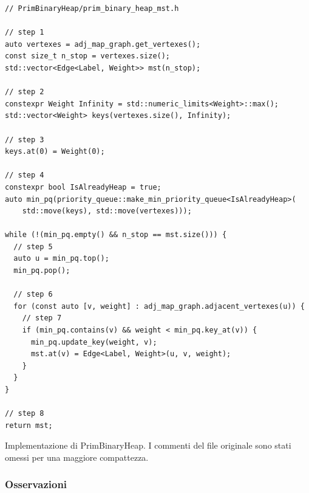 \begin{listing}[!ht]
\begin{verbatim}
// PrimBinaryHeap/prim_binary_heap_mst.h

// step 1
auto vertexes = adj_map_graph.get_vertexes();
const size_t n_stop = vertexes.size();
std::vector<Edge<Label, Weight>> mst(n_stop);

// step 2
constexpr Weight Infinity = std::numeric_limits<Weight>::max();
std::vector<Weight> keys(vertexes.size(), Infinity);

// step 3
keys.at(0) = Weight(0);

// step 4
constexpr bool IsAlreadyHeap = true;
auto min_pq(priority_queue::make_min_priority_queue<IsAlreadyHeap>(
    std::move(keys), std::move(vertexes)));

while (!(min_pq.empty() && n_stop == mst.size())) {
  // step 5
  auto u = min_pq.top();
  min_pq.pop();

  // step 6
  for (const auto [v, weight] : adj_map_graph.adjacent_vertexes(u)) {
    // step 7
    if (min_pq.contains(v) && weight < min_pq.key_at(v)) {
      min_pq.update_key(weight, v);
      mst.at(v) = Edge<Label, Weight>(u, v, weight);
    }
  }
}

// step 8
return mst;
\end{verbatim}
\caption{Implementazione di PrimBinaryHeap. I commenti del file originale sono stati omessi per una maggiore compattezza.}
\label{listing:prim-binary-heap}
\end{listing}

\subsubsection{Osservazioni}

